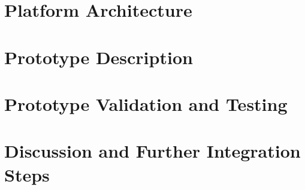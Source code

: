 \documentclass{SmartReport}
\begin{document}
\newpage


\section{Platform Architecture}
\label{sec:arch}

\newpage

% 

% 


\section{Prototype Description}
\label{sec:sw}

\newpage

\section{Prototype Validation and Testing}
\label{sec:sw}

\newpage


\section{Discussion and Further Integration Steps}
\label{sec:concl}

\newpage



%
\end{document}
